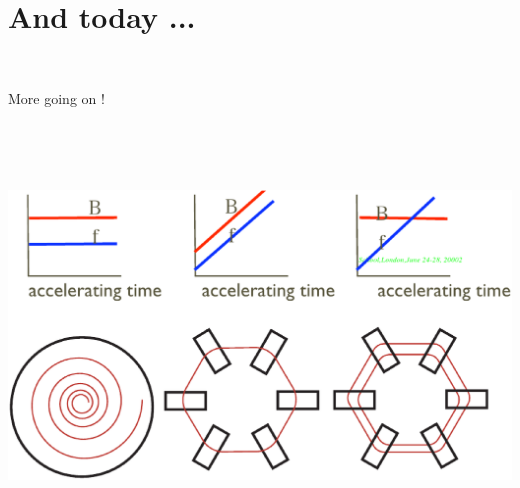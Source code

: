 \documentclass[12pt]{article}
\newcommand{\black}{\color{black}}
\newcommand{\blue}{\color{blue}}
\begin{document}
\black






\clearpage 

{\fontsize{18}{34} \selectfont

\bf 

\section*{\Huge And today ...}

~


\centerline{More going on !}



~


\centerline{\Huge \blue {}}
}

~


\centerline{
 \hspace{0mm}  \includegraphics[bbllx=14,bblly=140,bburx=781,bbury=568,width=15cm]{./figs_FFAG_introSlides/page3R.eps}
}
\end{document}
